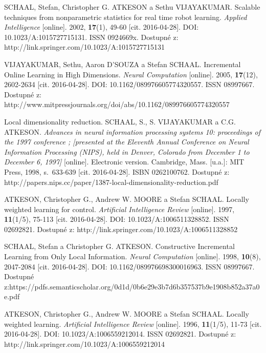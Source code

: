 \begin{thebibliography}{14}
	SCHAAL, Stefan, Christopher G. ATKESON a Sethu VIJAYAKUMAR. Scalable techniques from nonparametric statistics for real time robot learning. \textit{Applied Intelligence} [online]. 2002, \textbf{17}(1), 49-60 [cit. 2016-04-28]. DOI: 10.1023/A:1015727715131. ISSN 0924669x. Dostupné z: http://link.springer.com/10.1023/A:1015727715131
	
	VIJAYAKUMAR, Sethu, Aaron D'SOUZA a Stefan SCHAAL. Incremental Online Learning in High Dimensions. \textit{Neural Computation} [online]. 2005, \textbf{17}(12), 2602-2634 [cit. 2016-04-28]. DOI: 10.1162/089976605774320557. ISSN 08997667. Dostupné z: http://www.mitpressjournals.org/doi/abs/10.1162/089976605774320557
	
	Local dimensionality reduction. SCHAAL, S., S. VIJAYAKUMAR a C.G. ATKESON. \textit{Advances in neural information processing systems 10: proceedings of the 1997 conference ; [presented at the Eleventh Annual Conference on Neural Information Processing (NIPS), held in Denver, Colorado from December 1 to December 6, 1997]} [online]. Electronic version. Cambridge, Mass. [u.a.]: MIT Press, 1998, s.~633-639 [cit. 2016-04-28]. ISBN 0262100762. Dostupné z: http://papers.nips.cc/paper/1387-local-dimensionality-reduction.pdf
	
	ATKESON, Christopher G., Andrew W. MOORE a Stefan SCHAAL. Locally weighted learning for control. \textit{Artificial Intelligence Review} [online]. 1997, \textbf{11}(1/5), 75-113 [cit. 2016-04-28]. DOI: 10.1023/A:1006511328852. ISSN 02692821. Dostupné z: http://link.springer.com/10.1023/A:1006511328852
	
	SCHAAL, Stefan a Christopher G. ATKESON. Constructive Incremental Learning from Only Local Information. \textit{Neural Computation} [online]. 1998, \textbf{10}(8), 2047-2084 [cit. 2016-04-28]. DOI: 10.1162/089976698300016963. ISSN 08997667. Dostupné z:https://pdfs.semanticscholar.org/0d1d/0b6e29e3b7d6b357537b9e1908b852a37a0e.pdf
	
	ATKESON, Christopher G., Andrew W. MOORE a Stefan SCHAAL. Locally weighted learning. \textit{Artificial Intelligence Review} [online]. 1996, \textbf{11}(1/5), 11-73 [cit. 2016-04-28]. DOI: 10.1023/A:1006559212014. ISSN 02692821. Dostupné z: http://link.springer.com/10.1023/A:1006559212014
	
	
\end{thebibliography}